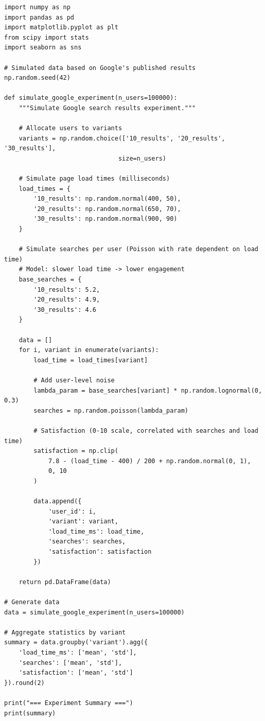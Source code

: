 \lstset{language=Python, caption=Analyzing Load Time vs. Engagement Trade-offs}
\begin{lstlisting}
import numpy as np
import pandas as pd
import matplotlib.pyplot as plt
from scipy import stats
import seaborn as sns

# Simulated data based on Google's published results
np.random.seed(42)

def simulate_google_experiment(n_users=100000):
    """Simulate Google search results experiment."""

    # Allocate users to variants
    variants = np.random.choice(['10_results', '20_results', '30_results'],
                               size=n_users)

    # Simulate page load times (milliseconds)
    load_times = {
        '10_results': np.random.normal(400, 50),
        '20_results': np.random.normal(650, 70),
        '30_results': np.random.normal(900, 90)
    }

    # Simulate searches per user (Poisson with rate dependent on load time)
    # Model: slower load time -> lower engagement
    base_searches = {
        '10_results': 5.2,
        '20_results': 4.9,
        '30_results': 4.6
    }

    data = []
    for i, variant in enumerate(variants):
        load_time = load_times[variant]

        # Add user-level noise
        lambda_param = base_searches[variant] * np.random.lognormal(0, 0.3)
        searches = np.random.poisson(lambda_param)

        # Satisfaction (0-10 scale, correlated with searches and load time)
        satisfaction = np.clip(
            7.8 - (load_time - 400) / 200 + np.random.normal(0, 1),
            0, 10
        )

        data.append({
            'user_id': i,
            'variant': variant,
            'load_time_ms': load_time,
            'searches': searches,
            'satisfaction': satisfaction
        })

    return pd.DataFrame(data)

# Generate data
data = simulate_google_experiment(n_users=100000)

# Aggregate statistics by variant
summary = data.groupby('variant').agg({
    'load_time_ms': ['mean', 'std'],
    'searches': ['mean', 'std'],
    'satisfaction': ['mean', 'std']
}).round(2)

print("=== Experiment Summary ===")
print(summary)


\end{lstlisting}
